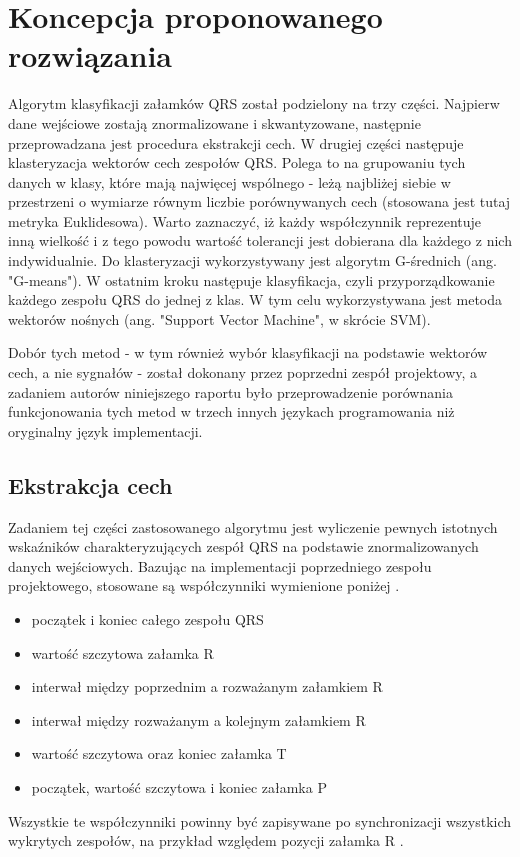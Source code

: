 \section{Koncepcja proponowanego rozwiązania}

\quad Algorytm klasyfikacji załamków QRS został podzielony na trzy części. Najpierw dane wejściowe zostają znormalizowane i skwantyzowane, następnie przeprowadzana jest procedura ekstrakcji cech. W drugiej części następuje klasteryzacja wektorów cech zespołów QRS. Polega to na grupowaniu tych danych w klasy, które mają najwięcej wspólnego - leżą najbliżej siebie w przestrzeni o wymiarze równym liczbie porównywanych cech (stosowana jest tutaj metryka Euklidesowa). Warto zaznaczyć, iż każdy współczynnik reprezentuje inną wielkość i z tego powodu wartość tolerancji jest dobierana dla każdego z nich indywidualnie. Do klasteryzacji wykorzystywany jest algorytm G-średnich (ang. "G-means"). W ostatnim kroku następuje klasyfikacja, czyli przyporządkowanie każdego zespołu QRS do jednej z klas. W tym celu wykorzystywana jest metoda wektorów nośnych (ang. "Support Vector Machine", w skrócie SVM).

Dobór tych metod - w tym również wybór klasyfikacji na podstawie wektorów cech, a nie sygnałów - został dokonany przez poprzedni zespół projektowy, a zadaniem autorów niniejszego raportu było przeprowadzenie porównania funkcjonowania tych metod w trzech innych językach programowania niż oryginalny język implementacji.

\subsection{Ekstrakcja cech}
\qquad Zadaniem tej części zastosowanego algorytmu jest wyliczenie pewnych istotnych wskaźników charakteryzujących zespół QRS na podstawie znormalizowanych danych wejściowych. Bazując na implementacji poprzedniego zespołu projektowego, stosowane są współczynniki wymienione poniżej \cite{RaportKoncowy}.
\begin{itemize}
	\item początek i koniec całego zespołu QRS
	\item wartość szczytowa załamka R
	\item interwał między poprzednim a rozważanym załamkiem R
	\item interwał między rozważanym a kolejnym załamkiem R
	\item wartość szczytowa oraz koniec załamka T
	\item początek, wartość szczytowa i koniec załamka P
\end{itemize}
Wszystkie te współczynniki powinny być zapisywane po synchronizacji wszystkich wykrytych zespołów, na przykład względem pozycji załamka R \cite{Augustyniak}.

